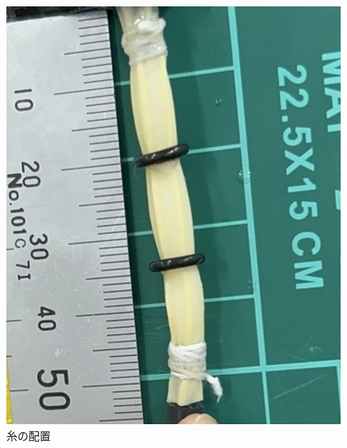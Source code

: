 \begin{figure}[h]
  \centering  %
  \includegraphics[scale=0.4]{pic/kutu.jpg}
  \caption{糸の配置}
  \label{fig:kutu}
\end{figure}

　


